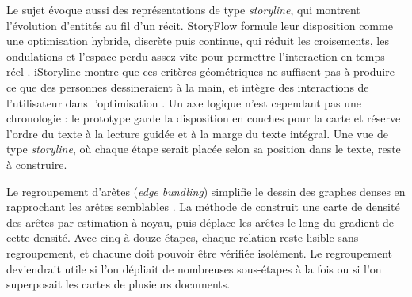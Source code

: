 Le sujet évoque aussi des représentations de type \emph{storyline}, qui montrent l’évolution d’entités au fil d’un récit. StoryFlow formule leur disposition comme une optimisation hybride, discrète puis continue, qui réduit les croisements, les ondulations et l’espace perdu assez vite pour permettre l’interaction en temps réel \parencite[2436]{ref11a}. iStoryline montre que ces critères géométriques ne suffisent pas à produire ce que des personnes dessineraient à la main, et intègre des interactions de l’utilisateur dans l’optimisation \parencite[769]{ref11b}. Un axe logique n’est cependant pas une chronologie : le prototype garde la disposition en couches pour la carte et réserve l’ordre du texte à la lecture guidée et à la marge du texte intégral. Une vue de type \emph{storyline}, où chaque étape serait placée selon sa position dans le texte, reste à construire.

Le regroupement d’arêtes (\emph{edge bundling}) simplifie le dessin des graphes denses en rapprochant les arêtes semblables \parencite{ref12b}. La méthode de \textcite{ref12} construit une carte de densité des arêtes par estimation à noyau, puis déplace les arêtes le long du gradient de cette densité. Avec cinq à douze étapes, chaque relation reste lisible sans regroupement, et chacune doit pouvoir être vérifiée isolément. Le regroupement deviendrait utile si l’on dépliait de nombreuses sous-étapes à la fois ou si l’on superposait les cartes de plusieurs documents.
